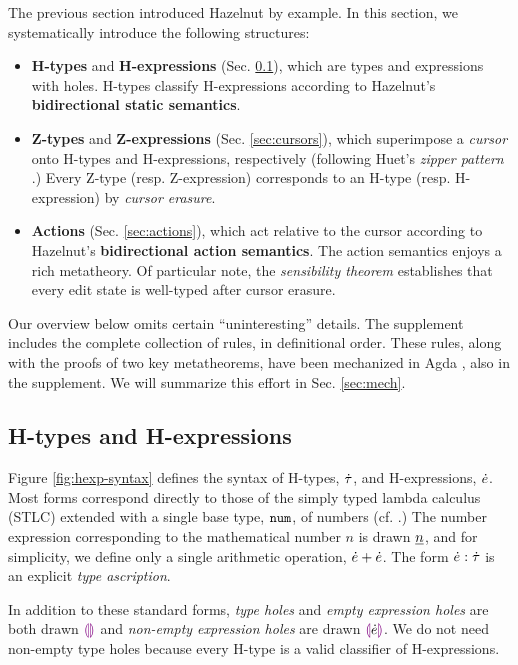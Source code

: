 
The previous section introduced Hazelnut by example. In this section, we
systematically introduce the following structures:
\begin{itemize}[itemsep=0px,partopsep=2px,topsep=2px]
\item \textbf{H-types} and \textbf{H-expressions} (Sec. \ref{sec:holes}),
  which are types and expressions with {holes}. H-types classify
  H-expressions according to Hazelnut's \textbf{bidirectional static
    semantics}.

\item \textbf{Z-types} and \textbf{Z-expressions} (Sec. \ref{sec:cursors}),
  which superimpose\- a \emph{cursor} onto H-types and H-expressions,
  respectively (following Huet's \emph{zipper pattern}
  \cite{JFP::Huet1997}.) Every Z-type (resp. Z-expression) corresponds to
  an H-type (resp. H-expression) by \emph{cursor erasure}.

\item \textbf{Actions} (Sec. \ref{sec:actions}), which act relative to the
  cursor according to Hazelnut's \textbf{bidirectional action
    semantics}. The action semantics enjoys a rich metatheory. Of
  particular note, the \emph{sensibility theorem} establishes that every
  edit state is well-typed after cursor erasure.
\end{itemize}

Our overview below omits certain ``uninteresting'' details. The supplement
includes the complete collection of rules, in definitional order. These
rules, along with the proofs of two key metatheorems, have been mechanized
in Agda \cite{norell:thesis}, also in the supplement. We will summarize
this effort in Sec. \ref{sec:mech}.

\subsection{H-types and H-expressions}\label{sec:holes}
Figure \ref{fig:hexp-syntax} defines the syntax of H-types, $\dot{\tau}$, and
H-expressions, $\dot{e}$. Most forms correspond directly to those of the
simply typed lambda calculus (STLC) extended with a single base type,
$\texttt{num}$, of numbers (cf. \cite{pfpl}.) The number expression corresponding
to the mathematical number $n$ is drawn $\underline{n}$, and for simplicity, we
define only a single arithmetic operation, $\dot{e} + \dot{e}$. The form
$\dot{e} : \dot{\tau}$ is an explicit \emph{type ascription}.

In addition to these standard forms, \emph{type holes} and \emph{empty
  expression holes} are both drawn $\textcolor{violet}{\llparenthesis}\textcolor{violet}{\rrparenthesis}$ and \emph{non-empty expression
  holes} are drawn $\textcolor{violet}{\llparenthesis}\dot{e}\textcolor{violet}{\rrparenthesis}$. We do not need non-empty type holes
because every H-type is a valid classifier of H-expressions.


